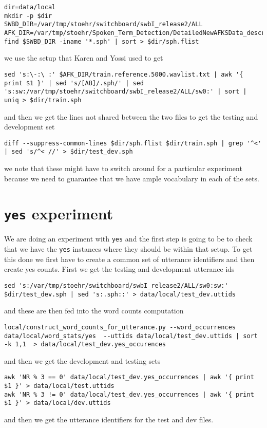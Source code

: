 \documentclass{article}
\begin{document}
\begin{verbatim}
dir=data/local
mkdir -p $dir
SWBD_DIR=/var/tmp/stoehr/switchboard/swbI_release2/ALL
AFK_DIR=/var/tmp/stoehr/Spoken_Term_Detection/DetailedNewAFKSData_description
find $SWBD_DIR -iname '*.sph' | sort > $dir/sph.flist
\end{verbatim}
we use the setup that Karen and Yossi used to get
\begin{verbatim}
sed 's:\-:\ :' $AFK_DIR/train.reference.5000.wavlist.txt | awk '{ print $1 }' | sed 's/[AB]/.sph/' | sed 's:sw:/var/tmp/stoehr/switchboard/swbI_release2/ALL/sw0:' | sort | uniq > $dir/train.sph
\end{verbatim}
and then we get the lines not shared between the two files to get the
testing and development set
\begin{verbatim}
diff --suppress-common-lines $dir/sph.flist $dir/train.sph | grep '^<' | sed 's/^< //' > $dir/test_dev.sph
\end{verbatim}
we note that these might have to switch around for a particular
experiment because we need to guarantee that we have ample
vocabulary in each of the sets.

\section{\texttt{yes} experiment}

We are doing an experiment with \texttt{yes}
and the first step is going to be to check that we have
the \texttt{yes} instances where they should be within
that setup.  To get this done we first have to create a common set
of utterance identifiers and then create yes counts.
First we get the testing and development utterance ids
\begin{verbatim}
sed 's:/var/tmp/stoehr/switchboard/swbI_release2/ALL/sw0:sw:' $dir/test_dev.sph | sed 's:.sph::' > data/local/test_dev.uttids
\end{verbatim}
and these are then fed into the word counts computation
\begin{verbatim}
local/construct_word_counts_for_utterance.py --word_occurrences data/local/word_stats/yes  --uttids data/local/test_dev.uttids | sort -k 1,1  > data/local/test_dev.yes_occurences
\end{verbatim}
and then we get the development and testing sets
\begin{verbatim}
awk 'NR % 3 == 0' data/local/test_dev.yes_occurrences | awk '{ print $1 }' > data/local/test.uttids
awk 'NR % 3 != 0' data/local/test_dev.yes_occurrences | awk '{ print $1 }' > data/local/dev.uttids
\end{verbatim}
and then we get the utterance identifiers for the test and dev files.
\end{document}
